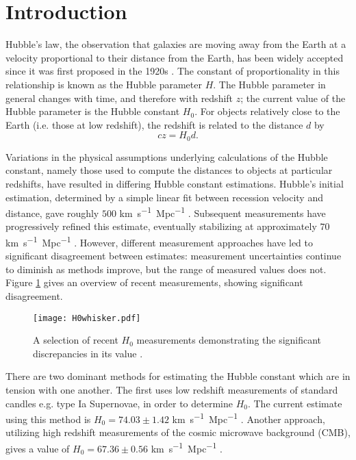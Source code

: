\section{\label{sec:intro} Introduction}

Hubble's law, the observation that galaxies are moving away from the Earth at a velocity proportional to their distance from the Earth, has been widely accepted since it was first proposed in the 1920s \cite{Hubble_1929}.
The constant of proportionality in this relationship is known as the Hubble parameter $H$.
The Hubble parameter in general changes with time, and therefore with redshift $z$; the current value of the Hubble parameter is the Hubble constant $H_0$.
For objects relatively close to the Earth (i.e. those at low redshift), the redshift is related to the distance $d$ by \cite{Freedman_2010}
\[
    c z = H_0 d.
\]

Variations in the physical assumptions underlying calculations of the Hubble constant, namely those used to compute the distances to objects at particular redshifts, have resulted in differing Hubble constant estimations.
Hubble’s initial estimation, determined by a simple linear fit between recession velocity and distance, gave roughly $500$ \si{km.s^{-1}.Mpc^{-1}} \cite{Hubble_1929}.
Subsequent measurements have progressively refined this estimate, eventually stabilizing at approximately $70$ \si{km.s^{-1}.Mpc^{-1}} \cite{Freedman_2010}.
However, different measurement approaches have led to significant disagreement between estimates: measurement uncertainties continue to diminish as methods improve, but the range of measured values does not.
Figure \ref{fig:hist_h0} gives an overview of recent measurements, showing significant disagreement.

\begin{figure}
    \centering
    \texttt{[image: H0whisker.pdf]}
    \caption{A selection of recent $H_0$ measurements demonstrating the significant discrepancies in its value \cite{Pogosian_2020, Planck_2020, Aiola_2020, WMAP_2018, Henning_2018, Planck_2016, Hinshaw_2013, Freedman_2001, Freedman_2012, Riess_2016, Feeney_2018, Burns_2018,  Riess_2019, Camarena_2020, Riess_2021, Breuval_2021}.}
    \label{fig:hist_h0}
\end{figure}

There are two dominant methods for estimating the Hubble constant which are in tension with one another.
The first uses low redshift measurements of standard candles e.g. type Ia Supernovae, in order to determine $H_0$.
The current estimate using this method is $H_0 = 74.03 \pm 1.42$ \si{km.s^{-1}.Mpc^{-1}} \cite{Riess_2019}.
Another approach, utilizing high redshift measurements of the cosmic microwave background (CMB), gives a value of $H_0 = 67.36 \pm 0.56$ \si{km.s^{-1}.Mpc^{-1}} \cite{Planck_2020}.

